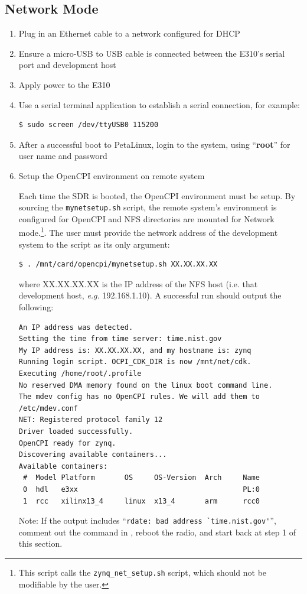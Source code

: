 \subsection{Network Mode}
\begin{enumerate}
\item Plug in an Ethernet cable to a network configured for DHCP
\item Ensure a micro-USB to USB cable is connected between the E310's serial port and development host
\item Apply power to the E310
\item Use a serial terminal application to establish a serial connection, for example:

\begin{verbatim}
$ sudo screen /dev/ttyUSB0 115200
\end{verbatim}

\item After a successful boot to PetaLinux, login to the system, using  ``\textbf{root}'' for user name and password

\item Setup the OpenCPI environment on remote system

\begin{flushleft}
Each time the SDR is booted, the OpenCPI environment must be setup. By sourcing the \texttt{mynetsetup.sh} script, the remote system's environment is configured for OpenCPI and NFS directories are mounted for Network mode.\footnote{This script calls the \texttt{zynq\_net\_setup.sh} script, which should not be modifiable by the user.}. The user must provide the network address of the development system to the script as its only argument:
\begin{verbatim}
$ . /mnt/card/opencpi/mynetsetup.sh XX.XX.XX.XX
\end{verbatim}

where XX.XX.XX.XX is the IP address of the NFS host (i.e. that development host, \textit{e.g.} 192.168.1.10). A successful run should output the following:
\begin{verbatim}
An IP address was detected.
Setting the time from time server: time.nist.gov
My IP address is: XX.XX.XX.XX, and my hostname is: zynq
Running login script. OCPI_CDK_DIR is now /mnt/net/cdk.
Executing /home/root/.profile
No reserved DMA memory found on the linux boot command line.
The mdev config has no OpenCPI rules. We will add them to /etc/mdev.conf
NET: Registered protocol family 12
Driver loaded successfully.
OpenCPI ready for zynq.
Discovering available containers...
Available containers:
 #  Model Platform       OS     OS-Version  Arch     Name
 0  hdl   e3xx                                       PL:0
 1  rcc   xilinx13_4     linux  x13_4       arm      rcc0
\end{verbatim}
Note: If the output includes ``\verb+rdate: bad address `time.nist.gov'+'', comment out the  command in , reboot the radio, and start back at step 1 of this section.
\end{flushleft}
\end{enumerate}

